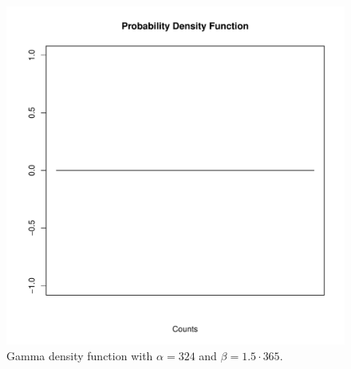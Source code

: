 \begin{figure}
\begin{knitrout}
\color{fgcolor}

{\centering \includegraphics[width=\textwidth-3cm]{figure/ch02_figunnamed-chunk-9-1} 

}


\end{knitrout}
  \caption{Gamma density function with $\alpha = 324$ and $\beta = 1.5 \cdot 365$.}
  \label{fig:2_8}
\end{figure}

